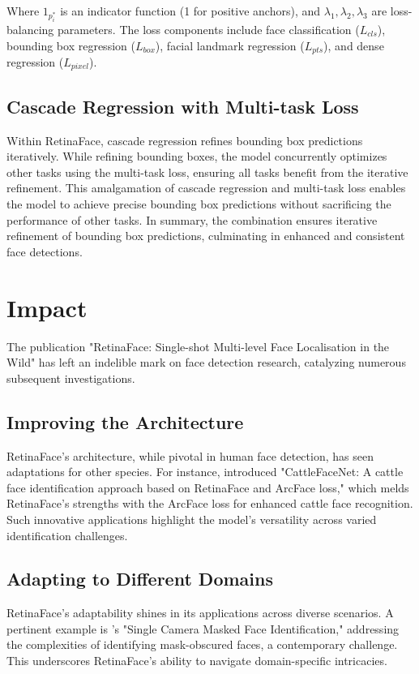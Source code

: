 \documentclass{article}
\begin{document}
Where \( 1_{p^*_i} \) is an indicator function (1 for positive anchors), and \( \lambda_1, \lambda_2, \lambda_3 \) are loss-balancing parameters. The loss components include face classification (\(L_{cls}\)), bounding box regression (\(L_{box}\)), facial landmark regression (\(L_{pts}\)), and dense regression (\(L_{pixel}\)).

\subsection{Cascade Regression with Multi-task Loss}

Within RetinaFace, cascade regression refines bounding box predictions iteratively. While refining bounding boxes, the model concurrently optimizes other tasks using the multi-task loss, ensuring all tasks benefit from the iterative refinement. This amalgamation of cascade regression and multi-task loss enables the model to achieve precise bounding box predictions without sacrificing the performance of other tasks. In summary, the combination ensures iterative refinement of bounding box predictions, culminating in enhanced and consistent face detections.

\section{Impact}

The publication "RetinaFace: Single-shot Multi-level Face Localisation in the Wild" has left an indelible mark on face detection research, catalyzing numerous subsequent investigations.

\subsection{Improving the Architecture}
RetinaFace's architecture, while pivotal in human face detection, has seen adaptations for other species. For instance, \cite{xu2022cattlefacenet} introduced "CattleFaceNet: A cattle face identification approach based on RetinaFace and ArcFace loss," which melds RetinaFace's strengths with the ArcFace loss for enhanced cattle face recognition. Such innovative applications highlight the model's versatility across varied identification challenges.

\subsection{Adapting to Different Domains}
RetinaFace's adaptability shines in its applications across diverse scenarios. A pertinent example is \cite{aswal2020single}'s "Single Camera Masked Face Identification," addressing the complexities of identifying mask-obscured faces, a contemporary challenge. This underscores RetinaFace's ability to navigate domain-specific intricacies.
\end{document}
